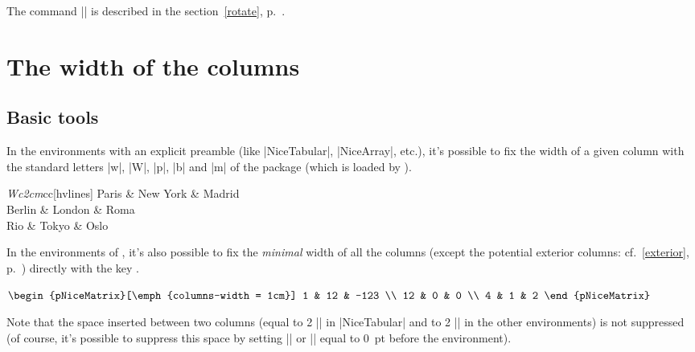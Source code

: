 \documentclass[dvipsnames]{article}
\begin{document}
\medskip
The command |\rotate| is described in the section~\ref{rotate}, p.~\pageref{rotate}.



\section{The width of the columns}

\label{width}

\subsection{Basic tools}

In the environments with an explicit preamble (like |{NiceTabular}|,
|{NiceArray}|, etc.), it's possible to fix the width of a given column with
the standard letters |w|, |W|, |p|, |b| and |m| of the package 
(which is loaded by ).

\medskip
\begin{Code}[width=9cm,show-output,no-cell-nodes]
\begin{NiceTabular}{\emph{W{c}{2cm}}cc}[hvlines]
  Paris  & New York & Madrid \\
  Berlin & London   & Roma   \\
  Rio    & Tokyo    & Oslo 
\end{NiceTabular}
\end{Code}


\bigskip
{} In the environments of , it's also
possible to fix the \emph{minimal} width of all the columns (except the
potential exterior columns: cf.~\ref{exterior}, p.~\pageref{exterior}) directly
with the key .

\medskip
\begin{Code}[width=10cm,show-output,no-cell-nodes]
$\begin{pNiceMatrix}[\emph{columns-width = 1cm}]
  1  & 12 & -123 \\
  12 & 0  & 0    \\
  4  & 1  & 2 
\end{pNiceMatrix}$
\end{Code}


\medskip
Note that the space inserted between two columns (equal to 2 |\tabcolsep| in
|{NiceTabular}| and to 2 |\arraycolsep| in the other environments)
is not suppressed (of course, it's possible to suppress this space by setting
|\tabcolsep| or |\arraycolsep| equal to $0$~pt before the environment).
\end{document}
